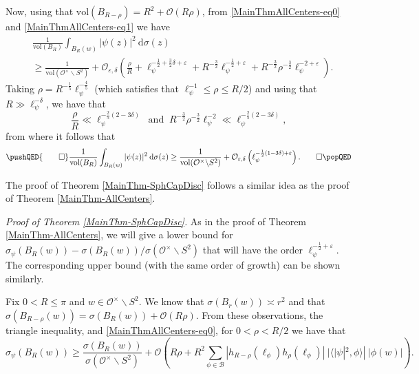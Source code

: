 \documentclass[11pt]{amsart}
\theoremstyle{definition}
\begin{document}
Now, using that $\mathrm{vol}(B_{R-\rho}) = R^2 + \mathcal{O}(R\rho)$, from \eqref{MainThmAllCenters-eq0} and \eqref{MainThmAllCenters-eq1} we have 
\begin{align*}
    &\frac{1}{\mathrm{vol}(B_R)} \int_{B_{R}(w)} |\psi(z)|^2 \: \mathrm{d}\sigma(z) \\
    &\geq \frac{1}{\mathrm{vol}(\mathcal{O}^{\times} \backslash S^2)} + \mathcal{O}_{\varepsilon, \delta}\left( \frac{\rho}{R} + \ell_{\psi}^{-\frac{1}{2} + \frac{3}{2}\delta + \varepsilon} + R^{-\frac{3}{2}} \ell_{\psi}^{- \frac{1}{2} + \varepsilon} + R^{-\frac{3}{2}} \rho^{-\frac{3}{2}} \ell_{\psi}^{-2+\varepsilon} \right).
\end{align*}
Taking $\rho = R^{-\frac{1}{5}} \ell_{\psi}^{-\frac{4}{5}}$ (which satisfies that $\ell_{\psi}^{-1} \leq \rho \leq R/2$) and using that $R \gg \ell_{\psi}^{-\delta}$, we have that $$ \frac{\rho}{R} \ll \ell_{\psi}^{-\frac{2}{5}(2-3\delta)} \: \text{ and } \: R^{-\frac{3}{2}} \rho^{-\frac{3}{2}} \ell_{\psi}^{-2} \ll \ell_{\psi}^{-\frac{2}{5}(2-3\delta)},$$ from where it follows that 
\[
\pushQED{\qed} 
\frac{1}{\mathrm{vol}(B_R)} \int_{B_{R}(w)} |\psi(z)|^2 \: \mathrm{d}\sigma(z) \geq \frac{1}{\mathrm{vol}(\mathcal{O}^{\times} \backslash S^2)} + \mathcal{O}_{\varepsilon, \delta}\left( \ell_{\psi}^{-\frac{1}{2}(1-3\delta) + \varepsilon} \right). \qedhere
\popQED 
\]









The proof of Theorem \ref{MainThm-SphCapDisc} follows a similar idea as the proof of Theorem \ref{MainThm-AllCenters}.

\vspace{0.3cm}

\noindent \textit{Proof of Theorem \ref{MainThm-SphCapDisc}.} As in the proof of Theorem \ref{MainThm-AllCenters}, we will give a lower bound for $\sigma_{\psi}(B_{R}(w)) - \sigma(B_{R}(w))/\sigma(\mathcal{O}^{\times} \backslash S^2)$ that will have the order $\ell_{\psi}^{-\frac{1}{2}+\varepsilon}$. The corresponding upper bound (with the same order of growth) can be shown similarly.

Fix $0<R\leq \pi$ and $w\in \mathcal{O}^{\times} \backslash S^2$. We know that $\sigma(B_r(w)) \asymp r^2$ and that $\sigma(B_{R-\rho}(w)) = \sigma(B_{R}(w)) + \mathcal{O}(R\rho)$. From these observations, the triangle inequality, and \eqref{MainThmAllCenters-eq0}, for $0<\rho<R/2$ we have that
\begin{equation}
    \sigma_{\psi}(B_{R}(w)) \geq \frac{\sigma(B_{R}(w))}{\sigma(\mathcal{O}^{\times} \backslash S^2)} + \mathcal{O}\left( R\rho + R^2 \sum_{\phi \in \mathcal{B}} |h_{R-\rho}(\ell_{\phi}) h_{\rho}(\ell_{\phi})| \: |\langle |\psi|^2, \phi \rangle| \: |\phi(w)| \right). \label{ProofMainThmSphCapDisc-eq1}
\end{equation}
\end{document}
